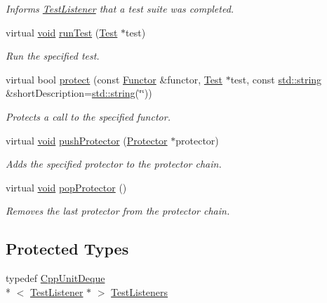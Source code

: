 \begin{DoxyCompactItemize}
\begin{DoxyCompactList}\small\item\em Informs \hyperlink{class_test_listener}{Test\-Listener} that a test suite was completed. \end{DoxyCompactList}\item 
virtual \hyperlink{wglew_8h_aeea6e3dfae3acf232096f57d2d57f084}{void} \hyperlink{class_test_result_ae00af1cdee85b14923b80a01678478ee}{run\-Test} (\hyperlink{class_test}{Test} $\ast$test)
\begin{DoxyCompactList}\small\item\em Run the specified test. \end{DoxyCompactList}\item 
virtual bool \hyperlink{class_test_result_a243b3097a3d9468abc61e7910bbaa8b7}{protect} (const \hyperlink{class_functor}{Functor} \&functor, \hyperlink{class_test}{Test} $\ast$test, const \hyperlink{glew_8h_ae84541b4f3d8e1ea24ec0f466a8c568b}{std\-::string} \&short\-Description=\hyperlink{glew_8h_ae84541b4f3d8e1ea24ec0f466a8c568b}{std\-::string}(\char`\"{}\char`\"{}))
\begin{DoxyCompactList}\small\item\em Protects a call to the specified functor. \end{DoxyCompactList}\item 
virtual \hyperlink{wglew_8h_aeea6e3dfae3acf232096f57d2d57f084}{void} \hyperlink{class_test_result_a1a4fbbca38cb73e8e00905193b7593dc}{push\-Protector} (\hyperlink{class_protector}{Protector} $\ast$protector)
\begin{DoxyCompactList}\small\item\em Adds the specified protector to the protector chain. \end{DoxyCompactList}\item 
virtual \hyperlink{wglew_8h_aeea6e3dfae3acf232096f57d2d57f084}{void} \hyperlink{class_test_result_acfbbc6037e1af423f93cdb0360076524}{pop\-Protector} ()
\begin{DoxyCompactList}\small\item\em Removes the last protector from the protector chain. \end{DoxyCompactList}\end{DoxyCompactItemize}
\subsection*{Protected Types}
\begin{DoxyCompactItemize}
\item 
typedef \hyperlink{_cpp_unit_deque_8h_a3425728ebb9dff4afd4dcb7e6f270905}{Cpp\-Unit\-Deque}\\*
$<$ \hyperlink{class_test_listener}{Test\-Listener} $\ast$ $>$ \hyperlink{class_test_result_a781741f5636cab07026c43e141781d19}{Test\-Listeners}
\end{DoxyCompactItemize}
